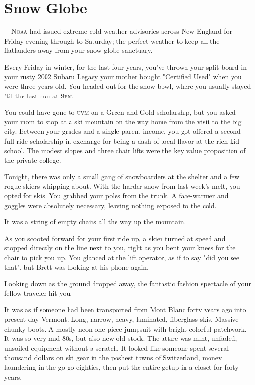 \documentclass[a5paper, symmetric]{tufte-book}
\begin{document}
\mainmatter


\chapter{Snow Globe}
\label{ch:snow-globe}


―\textsc{Noaa} had issued extreme cold weather advisories across New England for Friday evening through to Saturday; the perfect weather to keep all the flatlanders away from your snow globe sanctuary.

Every Friday in winter, for the last four years, you've thrown your split-board in your rusty 2002 Subaru Legacy your mother bought "Certified Used" when you were three years old. You headed out for the snow bowl, where you usually stayed 'til the last run at 9\textsc{pm}. 

You could have gone to \textsc{uvm} on a Green and Gold scholarship, but you asked your mom to stop at a ski mountain on the way home from the visit to the big city. Between your grades and a single parent income, you got offered a second full ride scholarship in exchange for being a dash of local flavor at the rich kid school. The modest slopes and three chair lifts were the key value proposition of the private college.

Tonight, there was only a small gang of snowboarders at the shelter and a few rogue skiers whipping about. With the harder snow from last week's melt, you opted for skis. You grabbed your poles from the trunk. A face-warmer and goggles were absolutely necessary, leaving nothing exposed to the cold.

It was a string of empty chairs all the way up the mountain. 

As you scooted forward for your first ride up, a skier turned at speed and stopped directly on the line next to you, right as you bent your knees for the chair to pick you up. You glanced at the lift operator, as if to say "did you see that", but Brett was looking at his phone again. 

Looking down as the ground dropped away, the fantastic fashion spectacle of your fellow traveler hit you. 

It was as if someone had been transported from Mont Blanc forty years ago into present day Vermont. Long, narrow, heavy, laminated, fiberglass skis. Massive chunky boots. A mostly neon one piece jumpsuit with bright colorful patchwork. It was so very mid-80s, but also new old stock. The attire was mint, unfaded, unsoiled equipment without a scratch. It looked like someone spent several thousand dollars on ski gear in the poshest towns of Switzerland, money laundering in the go-go eighties, then put the entire getup in a closet for forty years.
\end{document}
